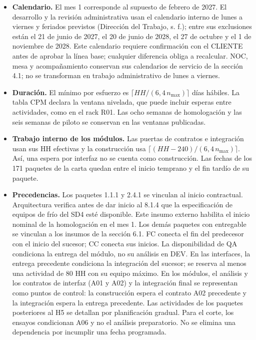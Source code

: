 \begin{itemize}
\item \textbf{Calendario.} El mes 1 corresponde al supuesto de febrero de 2027. El desarrollo y la revisión administrativa usan el calendario interno de lunes a viernes y feriados previstos (Dirección del Trabajo, s. f.); entre sus exclusiones están el 21 de junio de 2027, el 20 de junio de 2028, el 27 de octubre y el 1 de noviembre de 2028. Este calendario requiere confirmación con el CLIENTE antes de aprobar la línea base; cualquier diferencia obliga a recalcular. NOC, mesa y acompañamiento conservan sus calendarios de servicio de la sección 4.1; no se transforman en trabajo administrativo de lunes a viernes.
\item \textbf{Duración.} El mínimo por esfuerzo es $\lceil HH/(6,4\,n_{\max})\rceil$ días hábiles. La tabla CPM declara la ventana nivelada, que puede incluir esperas entre actividades, como en el rack R01. Las ocho semanas de homologación y las seis semanas de piloto se conservan en las ventanas publicadas.
\item \textbf{Trabajo interno de los módulos.} Las puertas de contratos e integración usan sus HH efectivas y la construcción usa $\lceil(HH-240)/(6,4\,n_{\max})\rceil$. Así, una espera por interfaz no se cuenta como construcción. Las fechas de los 171 paquetes de la carta quedan entre el inicio temprano y el fin tardío de su paquete.
\item \textbf{Precedencias.} Los paquetes 1.1.1 y 2.4.1 se vinculan al inicio contractual. Arquitectura verifica antes de dar inicio al 8.1.4 que la especificación de equipos de frío del SD4 esté disponible. Este insumo externo habilita el inicio nominal de la homologación en el mes 1. Los demás paquetes con entregable se vinculan a los insumos de la sección 6.1. FC conecta el fin del predecesor con el inicio del sucesor; CC conecta sus inicios. La disponibilidad de QA condiciona la entrega del módulo, no su análisis en DEV. En las interfaces, la entrega precedente condiciona la integración del sucesor; se reserva al menos una actividad de 80 HH con su equipo máximo. En los módulos, el análisis y los contratos de interfaz (A01 y A02) y la integración final se representan como puntos de control: la construcción espera el contrato A02 precedente y la integración espera la entrega precedente. Las actividades de los paquetes posteriores al H5 se detallan por planificación gradual. Para el corte, los ensayos condicionan A06 y no el análisis preparatorio. No se elimina una dependencia por incumplir una fecha programada.

\end{itemize}
